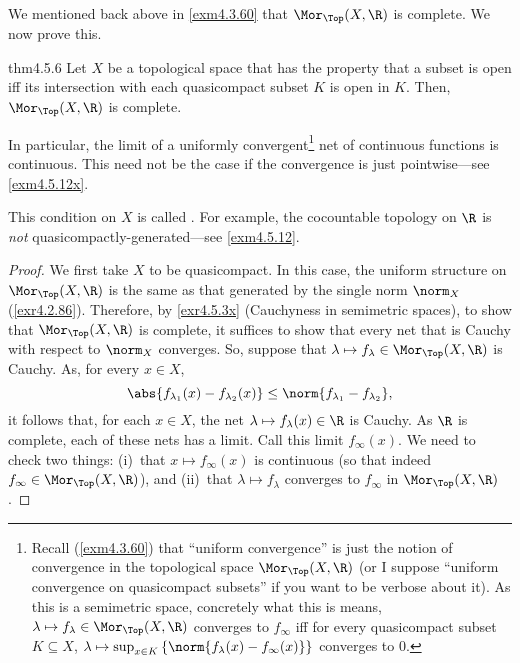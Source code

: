 We mentioned back above in \cref{exm4.3.60} that $\Mor _{\Top}(X,\R )$ is complete.  We now prove this.
\begin{thm}{}{thm4.5.6}
Let $X$ be a topological space that has the property that a subset is open iff its intersection with each quasicompact subset $K$ is open in $K$.  Then, $\Mor _{\Top}(X,\R )$ is complete.
\begin{rmk}
In particular, the limit of a uniformly convergent\footnote{Recall (\cref{exm4.3.60}) that ``uniform convergence'' is just the notion of convergence in the topological space $\Mor _{\Top}(X,\R )$ (or I suppose ``uniform convergence on quasicompact subsets'' if you want to be verbose about it).  As this is a semimetric space, concretely what this is means, $\lambda \mapsto f_{\lambda}\in \Mor _{\Top}(X,\R )$ converges to $f_{\infty}$ iff for every quasicompact subset $K\subseteq X$, $\lambda \mapsto \sup _{x\in K}\left\{ \norm{f_{\lambda}(x)-f_{\infty}(x)}\right\}$ converges to $0$.} net of continuous functions is continuous.  This need not be the case if the convergence is just pointwise---see \cref{exm4.5.12x}.
\end{rmk}
\begin{rmk}
This condition on $X$ is called .  For example, the cocountable topology on $\R$ is \emph{not} quasicompactly-generated---see \cref{exm4.5.12}.
\end{rmk}
\begin{proof}
We first take $X$ to be quasicompact.  In this case, the uniform structure on $\Mor _{\Top}(X,\R )$ is the same as that generated by the single norm $\norm _X$ (\cref{exr4.2.86}).  Therefore, by \cref{exr4.5.3x} (Cauchyness in semimetric spaces), to show that $\Mor _{\Top}(X,\R )$ is complete, it suffices to show that every net that is Cauchy with respect to $\norm _X$ converges.  So, suppose that $\lambda \mapsto f_\lambda \in \Mor _{\Top}(X,\R )$ is Cauchy.  As, for every $x\in X$,
\begin{equation}
\abs{f_{\lambda _1}(x)-f_{\lambda _2}(x)}\leq \norm{f_{\lambda _1}-f_{\lambda _2}},
\end{equation}
it follows that, for each $x\in X$, the net $\lambda \mapsto f_\lambda (x)\in \R$ is Cauchy.  As $\R$ is complete, each of these nets has a limit.  Call this limit $f_\infty (x)$.  We need to check two things:  (i)~that $x\mapsto f_\infty (x)$ is continuous (so that indeed $f_\infty \in \Mor _{\Top}(X,\R )$), and (ii)~that $\lambda \mapsto f_\lambda$ converges to $f_\infty$ in $\Mor _{\Top}(X,\R )$.


\end{proof}
\end{thm}
